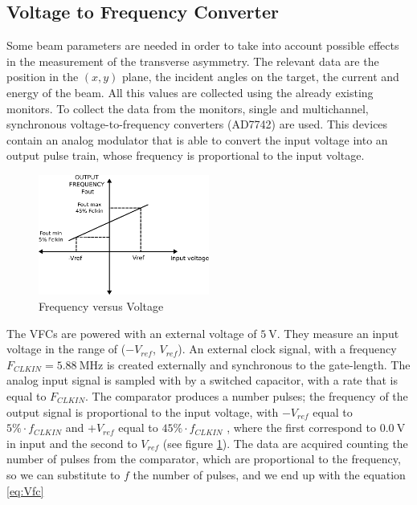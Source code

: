 \subsection{Voltage to Frequency Converter} \label{VFCss} 

Some beam parameters are needed in order to take into account possible effects in the measurement of the transverse asymmetry. The relevant data are the position in the $(x,y)$ plane, the incident angles on the target, the current and energy of the beam. All this values are collected using the already existing monitors.
To collect the data from the monitors, single and multichannel, synchronous voltage-to-frequency converters (AD7742) are used. This devices contain an analog modulator that is able to convert the input voltage into an output pulse train, whose frequency is proportional to the input voltage. 

\begin{figure}[htb]
\centering
\includegraphics[width=0.5\textwidth]{ExperimentalSetup/Vfc.pdf}
\caption{Frequency versus Voltage}
\label{fig:VoltageToFrequency}
\vspace{10pt}
\end{figure}

The VFCs are powered with an external voltage of $\SI{5}{\volt}$. They measure an input voltage in the range of ($-V_{ref}$, $V_{ref}$). An external clock signal, with a frequency $F_{CLKIN} = \SI{5.88}{\mega \hertz}$ is created externally and synchronous to the gate-length.
The analog input signal is sampled with by a switched capacitor, with a rate that is equal to $F_{CLKIN}$.
The comparator produces a number pulses; the frequency of the output signal is proportional to the input voltage, with $-V_{ref}$ equal to $5 \% \cdot f_{CLKIN}$ and $+V_{ref}$ equal to $45 \% \cdot f_{CLKIN}$ \cite{VfcDatasheet}, where the first correspond to $\SI{0.0}{ \volt}$ in input and the second to $V_{ref}$ (see figure \ref{fig:VoltageToFrequency}). The data are acquired counting the number of pulses from the comparator, which are proportional to the frequency, so we can substitute to $f$ the number of pulses, and we end up with the equation \ref{eq:Vfc}

